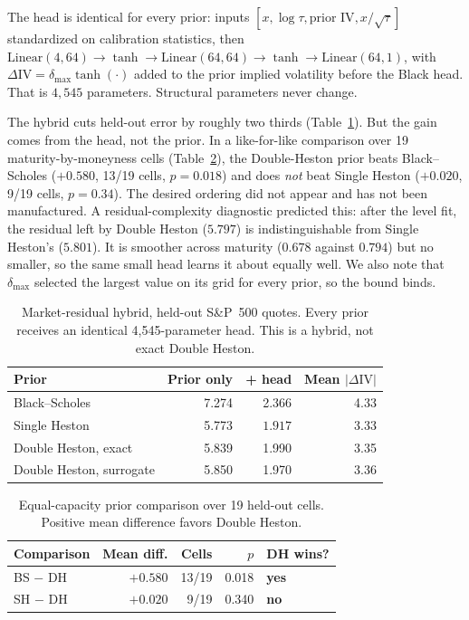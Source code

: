\documentclass[conference]{IEEEtran}
\begin{document}
The head is identical for every prior: inputs
$[x,\log\tau,\text{prior IV},x/\sqrt{\tau}]$ standardized on calibration
statistics, then $\mathrm{Linear}(4,64)\to\tanh\to\mathrm{Linear}(64,64)\to
\tanh\to\mathrm{Linear}(64,1)$, with
$\Delta\mathrm{IV}=\delta_{\max}\tanh(\cdot)$ added to the prior implied
volatility before the Black head. That is $4{,}545$ parameters. Structural
parameters never change.

The hybrid cuts held-out error by roughly two thirds
(Table~\ref{tab:hybrid}). But the gain comes from the head, not the prior. In a
like-for-like comparison over 19 maturity-by-moneyness cells
(Table~\ref{tab:prior}), the Double-Heston prior beats Black--Scholes
($+0.580$, 13/19 cells, $p=0.018$) and does \emph{not} beat Single Heston
($+0.020$, 9/19 cells, $p=0.34$). The desired ordering did not appear and has
not been manufactured. A residual-complexity diagnostic predicted this: after
the level fit, the residual left by Double Heston ($5.797$) is
indistinguishable from Single Heston's ($5.801$). It is smoother across
maturity ($0.678$ against $0.794$) but no smaller, so the same small head
learns it about equally well. We also note that $\delta_{\max}$ selected the
largest value on its grid for every prior, so the bound binds.

\begin{table}[!t]
\centering
\caption{Market-residual hybrid, held-out S\&P~500 quotes. Every prior receives
an identical 4,545-parameter head. This is a hybrid, not exact Double Heston.}
\label{tab:hybrid}
\begin{tabular}{lrrr}
\toprule
Prior & Prior only & + head & Mean $|\Delta\mathrm{IV}|$ \\
\midrule
Black--Scholes & 7.274 & 2.366 & 4.33 \\
Single Heston & 5.773 & $\mathbf{1.917}$ & 3.33 \\
Double Heston, exact & 5.839 & 1.990 & 3.35 \\
Double Heston, surrogate & 5.850 & 1.970 & 3.36 \\
\bottomrule
\end{tabular}
\end{table}

\begin{table}[!t]
\centering
\caption{Equal-capacity prior comparison over 19 held-out cells. Positive mean
difference favors Double Heston.}
\label{tab:prior}
\begin{tabular}{lrrrl}
\toprule
Comparison & Mean diff. & Cells & $p$ & DH wins? \\
\midrule
BS $-$ DH & $+0.580$ & 13/19 & 0.018 & \textbf{yes} \\
SH $-$ DH & $+0.020$ & 9/19 & 0.340 & \textbf{no} \\
\bottomrule
\end{tabular}
\end{table}
\end{document}
